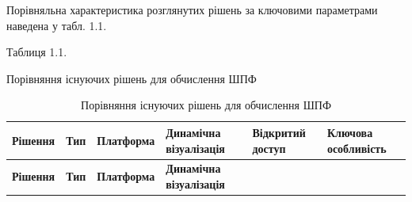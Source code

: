 \documentclass[
]{article}
\begin{document}
Порівняльна характеристика розглянутих рішень за ключовими параметрами
наведена у табл. 1.1.

Таблиця 1.1.

Порівняння існуючих рішень для обчислення ШПФ

\begin{longtable}[]{@{}
  >{\centering\arraybackslash}p{}
  >{\centering\arraybackslash}p{}
  >{\centering\arraybackslash}p{}
  >{\centering\arraybackslash}p{}
  >{\centering\arraybackslash}p{}
  >{\centering\arraybackslash}p{}@{}}
\caption[Порівняння існуючих рішень для обчислення ШПФ]{Порівняння
існуючих рішень для обчислення ШПФ}\tabularnewline
\toprule\noalign{}
\begin{minipage}[b]{\linewidth}\centering
\textbf{Рішення}
\end{minipage} & \begin{minipage}[b]{\linewidth}\centering
\textbf{Тип}
\end{minipage} & \begin{minipage}[b]{\linewidth}\centering
\textbf{Платформа}
\end{minipage} & \begin{minipage}[b]{\linewidth}\centering
\textbf{Динамічна візуалізація}
\end{minipage} & \begin{minipage}[b]{\linewidth}\centering
\textbf{Відкритий доступ}
\end{minipage} & \begin{minipage}[b]{\linewidth}\centering
\textbf{Ключова особливість}
\end{minipage} \\
\midrule\noalign{}
\endfirsthead
\toprule\noalign{}
\begin{minipage}[b]{\linewidth}\centering
\textbf{Рішення}
\end{minipage} & \begin{minipage}[b]{\linewidth}\centering
\textbf{Тип}
\end{minipage} & \begin{minipage}[b]{\linewidth}\centering
\textbf{Платформа}
\end{minipage} & \begin{minipage}[b]{\linewidth}\centering
\textbf{Динамічна візуалізація}
\end{minipage} & \begin{minipage}[b]{\linewidth}\centering

\end{minipage}
\end{longtable}
\end{document}
